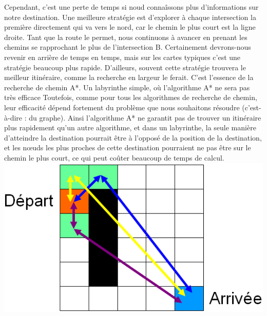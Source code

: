 \documentclass[a4paper,12pt]{article} %
\begin{document}
Cependant, c'est une perte de temps si noud connaîssons plus d'informations sur notre destination. Une meilleure stratégie est d'explorer à chaque intersection la première directement qui va vers le nord, car le chemin le plus court est la ligne droite. Tant que la route le permet, nous continuons à avancer en prenant les chemins se rapprochant le plus de l'intersection B. Certainement devrons-nous revenir en arrière de temps en temps, mais sur les cartes typiques c'est une stratégie beaucoup plus rapide. D'ailleurs, souvent cette stratégie trouvera le meilleur itinéraire, comme la recherche en largeur le ferait. C'est l'essence de la recherche de chemin A*.
Un labyrinthe simple, où l'algorithme A* ne sera pas très efficace
\newline
Toutefois, comme pour tous les algorithmes de recherche de chemin, leur efficacité dépend fortement du problème que nous souhaitons résoudre (c'est-à-dire : du graphe). Ainsi l'algorithme A* ne garantit pas de trouver un itinéraire plus rapidement qu'un autre algorithme, et dans un labyrinthe, la seule manière d'atteindre la destination pourrait être à l'opposé de la position de la destination, et les nœuds les plus proches de cette destination pourraient ne pas être sur le chemin le plus court, ce qui peut coûter beaucoup de temps de calcul.
\newline\newline
\includegraphics[scale=0.3]{astar.png}
\end{document}
